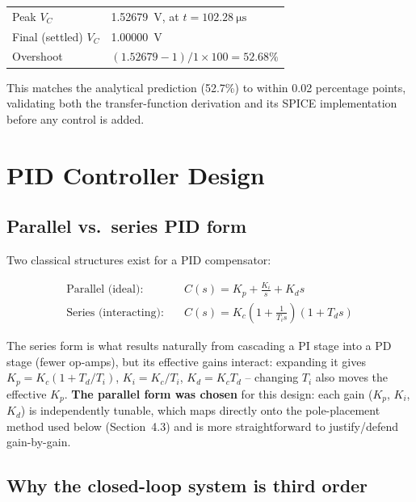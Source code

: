 \documentclass[11pt,letterpaper]{article}
\begin{document}
\begin{center}
\begin{tabular}{@{}ll@{}}
\toprule
Peak $V_C$ & \SI{1.52679}{\volt}, at $t=\SI{102.28}{\micro\second}$ \\
Final (settled) $V_C$ & \SI{1.00000}{\volt} \\
Overshoot & $(1.52679-1)/1 \times 100 = \boxed{52.68\%}$ \\
\bottomrule
\end{tabular}
\end{center}

This matches the analytical prediction (52.7\%) to within 0.02 percentage points, validating both the
transfer-function derivation and its SPICE implementation before any control is added.

\section{PID Controller Design}

\subsection{Parallel vs.\ series PID form}

Two classical structures exist for a PID compensator:

\begin{align}
\text{Parallel (ideal):} \quad & C(s) = K_p + \frac{K_i}{s} + K_d s \\
\text{Series (interacting):} \quad & C(s) = K_c\left(1+\frac{1}{T_i s}\right)(1+T_d s)
\end{align}

The series form is what results naturally from cascading a PI stage into a PD stage (fewer op-amps), but
its effective gains interact: expanding it gives $K_p = K_c(1+T_d/T_i)$, $K_i=K_c/T_i$, $K_d=K_cT_d$ --
changing $T_i$ also moves the effective $K_p$. \textbf{The parallel form was chosen} for this design: each
gain ($K_p$, $K_i$, $K_d$) is independently tunable, which maps directly onto the pole-placement method
used below (Section~4.3) and is more straightforward to justify/defend gain-by-gain.

\subsection{Why the closed-loop system is third order}
\end{document}

